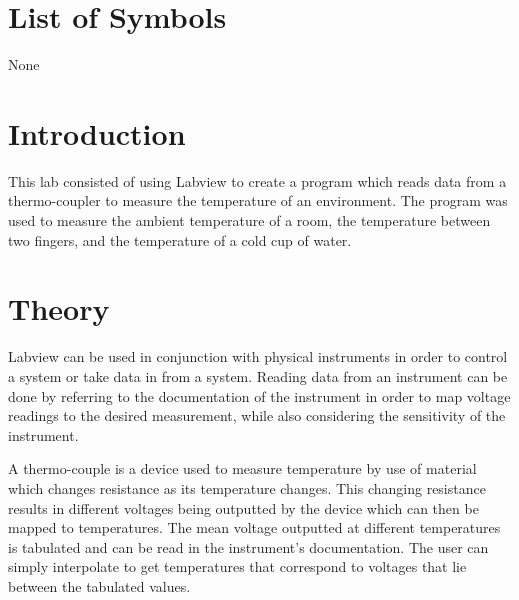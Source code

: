 \documentclass[12pt]{article}
\begin{document}

\tableofcontents

\listoffigures

\bigskip


\section*{\fontsize{12}{12}\selectfont \large List of Symbols}
None




\newpage



\section*{\fontsize{12}{12}\selectfont \large Introduction}

This lab consisted of using Labview to create a program which reads data from a thermo-coupler to measure the temperature of an environment. The program was used to measure the ambient temperature of a room, the temperature between two fingers, and the temperature of a cold cup of water. 

\section*{\fontsize{12}{12}\selectfont \large Theory}

Labview can be used in conjunction with physical instruments in order to control a system or take data in from a system. Reading data from an instrument can be done by referring to the documentation of the instrument in order to map voltage readings to the desired measurement, while also considering the sensitivity of the instrument. 
\bigskip

A thermo-couple is a device used to measure temperature by use of material which changes resistance as its temperature changes. This changing resistance results in different voltages being outputted by the device which can then be mapped to temperatures. The mean voltage outputted at different temperatures is tabulated and can be read in the instrument's documentation. The user can simply interpolate to get temperatures that correspond to voltages that lie between the tabulated values.
\bigskip
\end{document}
